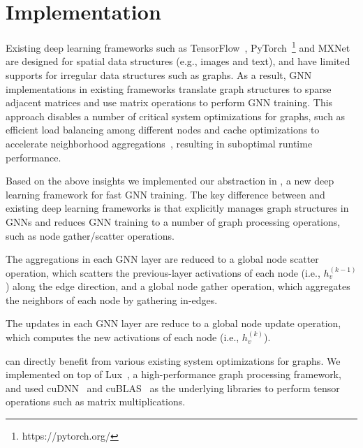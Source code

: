 \section{\xg Implementation}
\label{sec:impl}
Existing deep learning frameworks such as TensorFlow~\cite{Tensorflow}, PyTorch~\footnote{https://pytorch.org/} and MXNet~\cite{MXNet} are designed for spatial data structures (e.g., images and text), and have limited supports for irregular data structures such as graphs.
As a result, GNN implementations in existing frameworks translate graph structures to sparse adjacent matrices and use matrix operations to perform GNN training. 
This approach disables a number of critical system optimizations for graphs, such as efficient load balancing among different nodes and cache optimizations to accelerate neighborhood aggregations~\cite{Lux}, resulting in suboptimal runtime performance.

Based on the above insights we implemented our \xg abstraction in \sys, a new deep learning framework for fast GNN training.
The key difference between \sys and existing deep learning frameworks is that \sys explicitly manages graph structures in GNNs and reduces GNN training to a number of graph processing operations, such as node gather/scatter operations.

The aggregations in each GNN layer are reduced to a global node scatter operation, which scatters the previous-layer activations of each node (i.e., $h^{(k-1)}_v$) along the edge direction, and a global node gather operation, which aggregates the neighbors of each node by gathering in-edges.

The updates in each GNN layer are reduce to a global node update operation, which computes the new activations of each node (i.e., $h^{(k)}_v$).

\sys can directly benefit from various existing system optimizations for graphs.
We implemented \sys on top of Lux~\cite{Lux}, a high-performance graph processing framework, and used cuDNN~\cite{cudnn} and cuBLAS~\cite{cublas} as the underlying libraries to perform tensor operations such as matrix multiplications.

